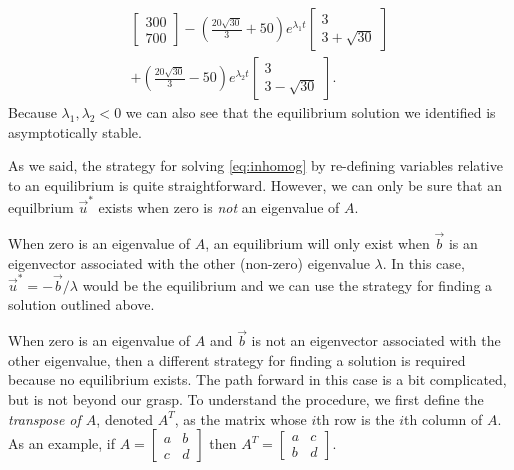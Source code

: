 \documentclass[../book.tex]{subfiles}
\begin{document}
\begin{solution}
\begin{multline}
  \begin{bmatrix} 300 \\ 700 \end{bmatrix} 
  -\left(\frac{20\sqrt{30}}{3} + 50\right)  e^{\lambda_1 t} \begin{bmatrix} 3 \\ 3 +\sqrt{30} \end{bmatrix}
  \\[1ex]+
  \left(\frac{20\sqrt{30}}{3} - 50\right) e^{\lambda_2 t} \begin{bmatrix} 3 \\ 3 -\sqrt{30} \end{bmatrix}.
\end{multline}
Because \(\lambda_1, \lambda_2 < 0\) we can also see that the equilibrium solution we identified is asymptotically stable.
\end{solution}

As we said, the strategy for solving \eqref{eq:inhomog} by re-defining variables relative to an equilibrium is quite straightforward. However, we can only be sure that an equilbrium \(\vec{u}^{ *}\) exists when zero is \emph{not} an eigenvalue of \(A\).

When zero is an eigenvalue of \(A\), an equilibrium will only exist when \(\vec{b}\) is an eigenvector associated with the other (non-zero) eigenvalue \(\lambda\). In this case, \(\vec{u}^{ *} = -\vec{b}/\lambda\) would be the equilibrium and we can use the strategy for finding a solution outlined above.

When zero is an eigenvalue of \(A\) and \(\vec{b}\) is not an eigenvector associated with the other eigenvalue, then a different strategy for finding a solution is required because no equilibrium exists. The path forward in this case is a bit complicated, but is not beyond our grasp. To understand the procedure, we first define the \emph{transpose of \(A\)}, denoted \(A^T\), as the matrix whose \(i\)th row is the \(i\)th column of \(A\). As an example, if \(A = \begin{bmatrix} a & b \\ c & d\end{bmatrix}\) then \(A^T = \begin{bmatrix}a & c \\ b & d \end{bmatrix}\).
\end{document}
